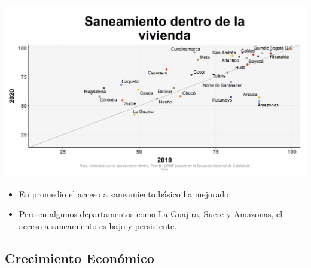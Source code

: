 \documentclass[aspectratio=169]{beamer}
\begin{document}
    \begin{slide}{7} 
                      \begin{imagecolumn}
                \includegraphics[width=\columnwidth]{img/var_193_scatter_time.png}
            \end{imagecolumn}
            \begin{textcolumn}
                \begin{itemize}
                    \item En promedio el acceso a saneamiento básico ha mejorado
                    \item Pero en algunos departamentos como La Guajira, Sucre y Amazonas, el acceso a saneamiento es bajo y persistente. 
                \end{itemize}
            \end{textcolumn}

    \printcolumns
    \end{slide}
    
    
    \subsection{Crecimiento Económico}
    
\end{document}
